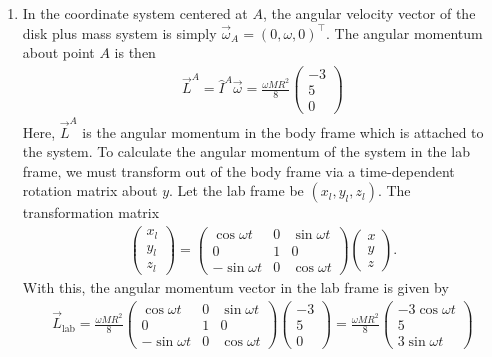 \documentclass{article}
\theoremstyle{definition}
\newcommand{\f}[2]{\frac{#1}{#2}}
\begin{document}
\begin{enumerate}[label=(\alph*)]
	\item In the coordinate system centered at $A$, the angular velocity vector of the disk plus mass system is simply $\vec{\omega}_A = (0,\omega,0)^\top$. The angular momentum about point $A$ is then 
	\begin{align*}
	\vec{L}^A = \hat I^A \vec{\omega}= \f{\omega MR^2}{8}\begin{pmatrix}
	-3 \\ 5 \\ 0
	\end{pmatrix}
	\end{align*}
	Here, $\vec{L}^A$ is the angular momentum in the body frame which is attached to the system. To calculate the angular momentum of the system in the lab frame, we must transform out of the body frame via a time-dependent rotation matrix about $y$. Let the lab frame be $(x_l, y_l, z_l)$. The transformation matrix 
	\begin{align*}
	\begin{pmatrix}
	x_l \\ y_l \\ z_l 
	\end{pmatrix}
	= 
	\begin{pmatrix}
	\cos\omega t & 0 & \sin\omega t \\
	0&1&0 \\
	-\sin\omega t& 0 & \cos\omega t
	\end{pmatrix}
	\begin{pmatrix}
	x\\y\\z
	\end{pmatrix}.
	\end{align*}
	With this, the angular momentum vector in the lab frame is given by 
	\begin{align*}
	\vec{L}_\text{lab} = 
	\f{\omega MR^2}{8}\begin{pmatrix}
	\cos\omega t & 0 & \sin\omega t \\
	0&1&0 \\
	-\sin\omega t& 0 & \cos\omega t
	\end{pmatrix} 
	\begin{pmatrix}
	-3 \\ 5 \\ 0
	\end{pmatrix} = \boxed{\f{\omega MR^2}{8}
	\begin{pmatrix}
	-3\cos\omega t \\
	5 \\ 
	3\sin\omega t
	\end{pmatrix}}
	\end{align*}
	

\end{enumerate}
\end{document}
